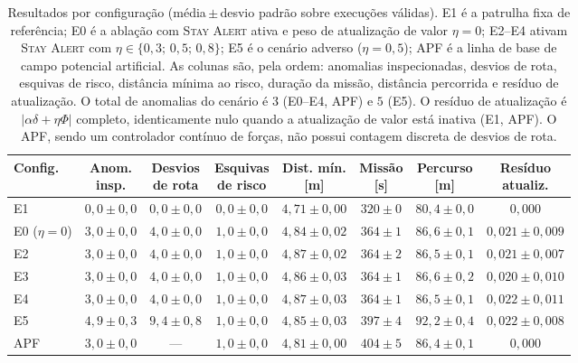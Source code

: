 \begin{table}[htb]
\centering
\caption{Resultados por configuração (média\,$\pm$\,desvio padrão sobre execuções
válidas). E1 é a patrulha fixa de referência; E0 é a ablação com \textsc{Stay Alert}
ativa e peso de atualização de valor $\eta=0$; E2--E4 ativam \textsc{Stay Alert} com
$\eta\in\{0{,}3;\,0{,}5;\,0{,}8\}$; E5 é o cenário adverso ($\eta=0{,}5$); APF é a
linha de base de campo potencial artificial. As colunas são, pela ordem: anomalias
inspecionadas, desvios de rota, esquivas de risco, distância mínima ao risco, duração
da missão, distância percorrida e resíduo de atualização. O total de anomalias do
cenário é $3$ (E0--E4, APF) e $5$ (E5). O resíduo de atualização é
$|\alpha\delta+\eta\Phi|$ completo, identicamente nulo quando a atualização de valor
está inativa (E1, APF). O APF, sendo um controlador contínuo de forças, não possui
contagem discreta de desvios de rota.}
\label{tab:res-principal}
\footnotesize
\setlength{\tabcolsep}{4pt}
\begin{tabular}{lccccccc}
\hline
\textbf{Config.}
 & \shortstack{\textbf{Anom.}\\\textbf{insp.}}
 & \shortstack{\textbf{Desvios}\\\textbf{de rota}}
 & \shortstack{\textbf{Esquivas}\\\textbf{de risco}}
 & \shortstack{\textbf{Dist. mín.}\\\textbf{[m]}}
 & \shortstack{\textbf{Missão}\\\textbf{[s]}}
 & \shortstack{\textbf{Percurso}\\\textbf{[m]}}
 & \shortstack{\textbf{Resíduo}\\\textbf{atualiz.}}\\
\hline
E1                & $0{,}0\pm0{,}0$ & $0{,}0\pm0{,}0$ & $0{,}0\pm0{,}0$ & $4{,}71\pm0{,}00$ & $320\pm0$ & $80{,}4\pm0{,}0$ & $0{,}000$\\
E0 ($\eta{=}0$)   & $3{,}0\pm0{,}0$ & $4{,}0\pm0{,}0$ & $1{,}0\pm0{,}0$ & $4{,}84\pm0{,}02$ & $364\pm1$ & $86{,}6\pm0{,}1$ & $0{,}021\pm0{,}009$\\
E2                & $3{,}0\pm0{,}0$ & $4{,}0\pm0{,}0$ & $1{,}0\pm0{,}0$ & $4{,}87\pm0{,}02$ & $364\pm2$ & $86{,}5\pm0{,}1$ & $0{,}021\pm0{,}007$\\
E3                & $3{,}0\pm0{,}0$ & $4{,}0\pm0{,}0$ & $1{,}0\pm0{,}0$ & $4{,}86\pm0{,}03$ & $364\pm1$ & $86{,}6\pm0{,}2$ & $0{,}020\pm0{,}010$\\
E4                & $3{,}0\pm0{,}0$ & $4{,}0\pm0{,}0$ & $1{,}0\pm0{,}0$ & $4{,}87\pm0{,}03$ & $364\pm1$ & $86{,}5\pm0{,}1$ & $0{,}022\pm0{,}011$\\
E5                & $4{,}9\pm0{,}3$ & $9{,}4\pm0{,}8$ & $1{,}0\pm0{,}0$ & $4{,}85\pm0{,}03$ & $397\pm4$ & $92{,}2\pm0{,}4$ & $0{,}022\pm0{,}008$\\
APF               & $3{,}0\pm0{,}0$ & ---             & $1{,}0\pm0{,}0$ & $4{,}81\pm0{,}00$ & $404\pm5$ & $86{,}4\pm0{,}1$ & $0{,}000$\\
\hline
\end{tabular}
\end{table}

